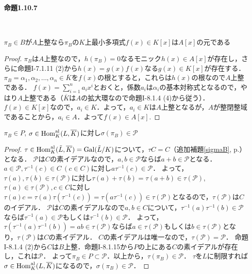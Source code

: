 \paragraph{命題1.10.7}~
\begin{screen}
    $\pi_B\in B$が$A$上整なら$\pi_B$の$K$上最小多項式$f(x)\in K[x]$は$A[x]$の元である
\end{screen}
\begin{proof}
  $\pi_B$は$A$上整なので，$h(\pi_B)=0$なるモニック$h(x)\in A[x]$が存在し，さらに命題I-7.1.11 (2)から$h(x)=g(x)f(x)$なる$g(x)\in K[x]$が存在する．
  $\pi_B=\alpha_1,\alpha_2,\ldots,\alpha_n\in\overline{K}$を$f(x)$の根とすると，これらは$h(x)$の根なので$A$上整である．
  $f(x)=\sum_{i=1}^na_ix^i$とおくと，係数$a_i$は$\alpha_i$の基本対称式となるので，やはり$A$上整である（$\overline{K}$は$A$の拡大環なので命題I-8.1.4 (4)から従う）．
  $f(x)\in K[x]$なので，$a_i\in K$．よって，$a_i\in K$は$A$上整となるが，$A$が整閉整域であることから，$a_i\in A$．よって$f(x)\in A[x]$.
\end{proof}

\begin{screen}
    $\pi_B\in P$, $\sigma\in\operatorname{Hom}^\text{al}_{K}(L,\overline{K})$に対し$\sigma(\pi_B)\in\mathcal{P}$
\end{screen}
\begin{proof}
  $\tau\in\operatorname{Hom}^\text{al}_K(\tilde{L},\overline{K})=\operatorname{Gal}(\tilde{L}/K)$について，$\tau C=C$（追加補題\ref{sigmaB}, p.\pageref{sigmaB}）となる．
  $\mathcal{P}$は$C$の素イデアルなので，$a,b\in\mathcal{P}$ならば$a+b\in\mathcal{P}$となる．
  $a\in\mathcal{P}, \tau^{-1}(c)\in C\ (c\in C)$に対し$a\tau^{-1}(c)\in\mathcal{P}$．
  よって，$\tau(a),\tau(b)\in\tau(\mathcal{P})$に対し$\tau(a)+\tau(b)=\tau(a+b)\in\tau(\mathcal{P})$, $\tau(a)\in\tau(\mathcal{P}), c\in C$に対し$\tau(a)c=\tau(a)\tau(\tau^{-1}(c))=\tau(a\tau^{-1}(c))\in\tau(\mathcal{P})$となるので，$\tau(\mathcal{P})$は$C$のイデアル．
  $\mathcal{P}$は$C$の素イデアルなので$a,b\in C$について，$\tau^{-1}(a)\tau^{-1}(b)\in\mathcal{P}$ならば$\tau^{-1}(a)\in\mathcal{P}$もしくは$\tau^{-1}(b)\in\mathcal{P}$．
  よって，$\tau(\tau^{-1}(a)\tau^{-1}(b))=ab\in\tau(\mathcal{P})$ならば$a\in\tau(\mathcal{P})$もしくは$b\in\tau(\mathcal{P})$となり，$\tau(\mathcal{P})$は$C$の素イデアル．
  $C$の素イデアルは唯一なので，$\tau(\mathcal{P})=\mathcal{P}$．
  命題I-8.1.4 (2)から$C$は$B$上整．命題I-8.1.15から$P$の上にある$C$の素イデアルが存在し，これは$\mathcal{P}$．
  よって$\pi_B\in P\subset\mathcal{P}$．以上から，$\tau(\pi_B)\in\mathcal{P}$．
  $\tau$を$L$に制限すれば$\sigma\in\operatorname{Hom}^\text{al}_K(L,\overline{K})$になるので，$\sigma(\pi_B)\in\mathcal{P}$．
\end{proof}

